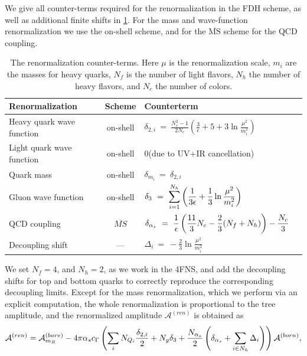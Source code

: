 We give all counter-terms required for the renormalization in the FDH scheme, as well as additional finite shifts in \cref{tab:renorm}.
For the mass and wave-function renormalization we use the on-shell scheme,
and for the $\overline{\text{MS}}$ scheme for the QCD coupling.
\begin{table}[h]
  \begin{tabular}{lcll}
    \toprule
    \textbf{Renormalization} & \textbf{Scheme} & \textbf{Counterterm} \\
    \midrule
    Heavy quark wave function   & on-shell & $\displaystyle \delta_{2,i} ~=~ \frac{N_c^2-1}{2N_c} \left( \frac{3}{\epsilon} + 5 + 3 \ln{\frac{\mu^2}{m_i^2}} \right)$\\
    Light quark wave function   & on-shell & 0\quad({\footnotesize due to UV+IR cancellation}) \\
    Quark mass            & on-shell & $\displaystyle \delta_{m_i} ~=~ \delta_{2,i}\quad\text{}$\\
    Gluon wave function   & on-shell & $\displaystyle \delta_3 ~=~ \sum_{i=1}^{N_h} \qty(\frac{1}{3\epsilon} + \frac{1}{3}\ln{\frac{\mu^2}{m_i^2}})$\\
    QCD coupling & $\overline{MS}$ & $\displaystyle \delta_{\alpha_s} ~=~ \frac{1}{\epsilon} \left( \frac{11}{3}N_c - \frac{2}{3}(N_f+N_h) \right) - \frac{N_c}{3}$\\
    \midrule
    Decoupling shift & --- & $\displaystyle     \Delta_i ~=~  -\frac{2}{3}\ln{\frac{\mu^2}{m_i^2}} $\\
    \bottomrule
  \end{tabular}
  \caption{The renormalization counter-terms. Here $\mu$ is the renormalization
    scale, $m_{i}$ are the masses for heavy quarks, $N_f$ is the number of light flavors,
    $N_h$ the number of heavy flavors, and $N_c$ the number of colors.
  }
  \label{tab:renorm}
\end{table}
We set $N_f=4$, and $N_h=2$, as we work in the 4FNS, and 
add the decoupling shifts for top and bottom quarks to correctly reproduce the corresponding decoupling limits.
Except for the mass renormalization, which we perform via an explicit computation,
the whole renormalization is proportional to the tree amplitude, 
and the renormalized amplitude $\mathcal{A}^{(ren)}$ is
obtained as
\begin{equation}
  \mathcal{A}^{(ren)} =
  \mathcal{A}^{(bare)}_{m_R} - 4\pi \alpha_s c_\Gamma 
  \left( \sum_i N_{Q_i} \frac{\delta_{2,i}}{2} + N_{g}\delta_3 + \frac{N_{\alpha_s}}{2}\left(\delta_{\alpha_s} + \sum_{i\in N_h}\Delta_i\right) \right)  \mathcal{A}^{(born)},
  \label{renfull}
\end{equation}
